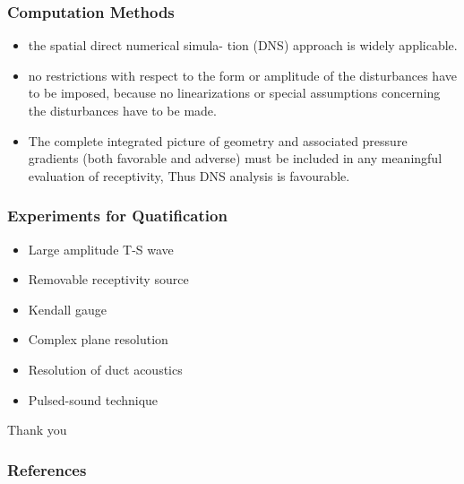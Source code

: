 \documentclass[aspectratio=149]{beamer}
\begin{document}
\begin{frame}
    \frametitle{Computation Methods}
    \begin{itemize}
        \item the spatial direct numerical simula- tion (DNS) approach is
          widely applicable.
        \item  no restrictions with respect to the form or amplitude of the
          disturbances have to be imposed, because no linearizations or
          special assumptions concerning the disturbances have to be made.
        \item The complete integrated picture of geometry and associated
          pressure gradients (both favorable and adverse) must be included
          in any meaningful evaluation of receptivity, Thus DNS analysis is
          favourable.

    \end{itemize}
\end{frame}

\begin{frame}
    \frametitle{Experiments for Quatification}
    \begin{itemize}
        \item Large amplitude T-S wave
        \item Removable receptivity source
        \item Kendall gauge
        \item Complex plane resolution
        \item Resolution of duct acoustics
        \item Pulsed-sound technique

    \end{itemize}
\end{frame}
\begin{frame}
    \centering
    Thank you
\end{frame}

\begin{frame}[t,allowframebreaks]
  \frametitle{References}
  \printbibliography{}
\end{frame}


\end{document}
